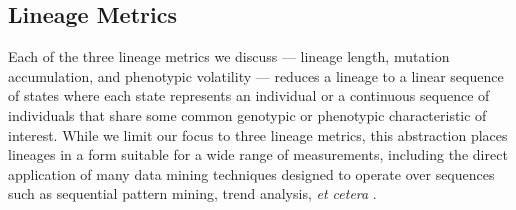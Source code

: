 \documentclass[letterpaper]{article}
\begin{document}
\subsection{Lineage Metrics}
Each of the three lineage metrics we discuss --- lineage length, mutation accumulation, and phenotypic volatility --- reduces a lineage to a linear sequence of states where each state represents an individual or a continuous sequence of individuals that share some common genotypic or phenotypic characteristic of interest. While we limit our focus to three lineage metrics, this abstraction places lineages in a form suitable for a wide range of measurements, including the direct application of many data mining techniques designed to operate over sequences such as sequential pattern mining, trend analysis, \textit{et cetera} \citep{han2011data}. 
\end{document}
